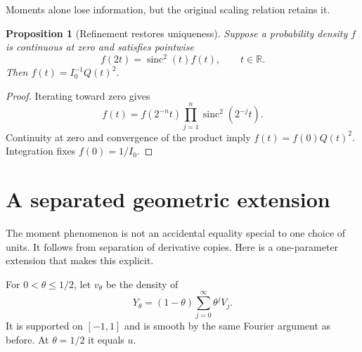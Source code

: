 \documentclass[11pt,a4paper]{article}
\numberwithin{equation}{section}
\newtheorem{proposition}[proposition]{Proposition}
\theoremstyle{definition}
\newcommand{\R}{\mathbb R}
\newcommand{\sinc}{\operatorname{sinc}}
\begin{document}
Moments alone lose information, but the original scaling relation
retains it.
\begin{proposition}[Refinement restores uniqueness]\label{prop:refinement-unique}
Suppose a probability density $f$ is continuous at zero and satisfies
pointwise
\begin{equation}
 f(2t)=\sinc^2(t)f(t),\qquad t\in\R.
 \label{eq:energy-refinement}
\end{equation}
Then $f(t)=I_0^{-1}Q(t)^2$.
\end{proposition}
\begin{proof}
Iterating toward zero gives
\begin{equation}
 f(t)=f(2^{-n}t)\prod_{j=1}^n\sinc^2(2^{-j}t).
\end{equation}
Continuity at zero and convergence of the product imply
$f(t)=f(0)Q(t)^2$. Integration fixes $f(0)=1/I_0$.
\end{proof}

\section{A separated geometric extension}\label{sec:geometric}

The moment phenomenon is not an accidental equality special to one
choice of units. It follows from separation of derivative copies.
Here is a one-parameter extension that makes this explicit.

For $0<\theta\leq1/2$, let $v_\theta$ be the density of
\begin{equation}
 Y_\theta=(1-\theta)\sum_{j=0}^{\infty}\theta^j V_j.
 \label{eq:geometric-series}
\end{equation}
It is supported on $[-1,1]$ and is smooth by the same Fourier
argument as before. At $\theta=1/2$ it equals $u$.
\end{document}
